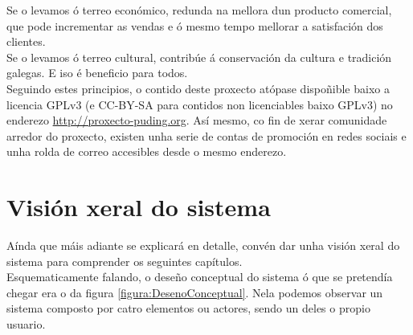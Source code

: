  Se o levamos ó terreo económico, redunda na mellora dun producto comercial,
 que pode incrementar as vendas e ó mesmo tempo mellorar a satisfación dos
 clientes. \\

 Se o levamos ó terreo cultural, contribúe á conservación da cultura e tradición
 galegas. E iso é beneficio para todos. \\

 Seguindo estes principios, o contido deste proxecto atópase dispoñible baixo a
 licencia GPLv3 (e CC-BY-SA para contidos non licenciables baixo GPLv3) no
 enderezo \url{http://proxecto-puding.org}. Así mesmo, co fin de xerar
 comunidade arredor do proxecto, existen unha serie de contas de promoción en
 redes sociais e unha rolda de correo accesibles desde o mesmo enderezo.

\section{Visión xeral do sistema}

 Aínda que máis adiante se explicará en detalle, convén dar unha visión xeral
 do sistema para comprender os seguintes capítulos. \\

 Esquematicamente falando, o deseño conceptual do sistema ó que se pretendía
 chegar era o da figura \ref{figura:DesenoConceptual}. Nela podemos observar
 un sistema composto por catro elementos ou actores, sendo un deles o propio
 usuario. \\

